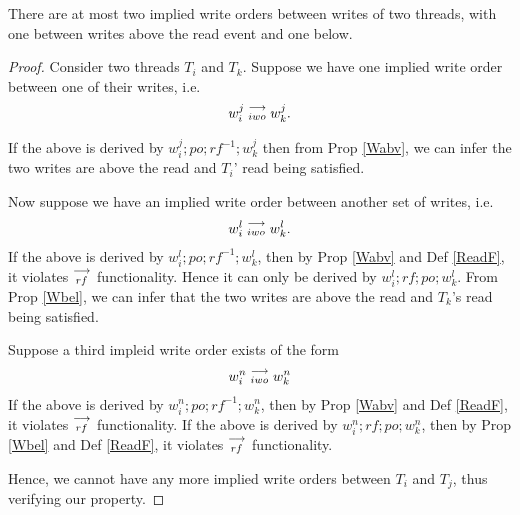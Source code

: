 
    \begin{property}
        \label{prop4}
        There are at most two implied write orders between writes of two threads, with one between writes above the read event and one below. 
    \end{property}
        
    \begin{proof}
        Consider two threads $T_i$ and $T_k$. Suppose we have one implied write order between one of their writes, i.e. 
        \begin{align*}
            w_i^j\stackrel{\longrightarrow}{_{iwo}}w_k^j.    
        \end{align*}

        If the above is derived by $w_i^j;po;rf^{-1};w_k^j$ then from Prop \ref{Wabv}, we can infer the two writes are above the read and $T_i$' read being satisfied.  

        Now suppose we have an implied write order between another set of writes, i.e.
        \begin{align*}
            w_i^l\stackrel{\longrightarrow}{_{iwo}}w_k^l.    
        \end{align*}
        If the above is derived by $w_i^l;po;rf^{-1};w_k^l$, then by Prop \ref{Wabv} and Def \ref{ReadF}, it violates $\stackrel{\longrightarrow}{_{rf}}$ functionality. Hence it can only be derived by $w_i^l;rf;po;w_k^l$. From Prop \ref{Wbel}, we can infer that the two writes are above the read and $T_k$'s read being satisfied.  
        
        Suppose a third impleid write order exists of the form 
        \begin{align*}
            w_i^n\stackrel{\longrightarrow}{_{iwo}}w_k^n
        \end{align*}
        If the above is derived by $w_i^n;po;rf^{-1};w_k^n$, then by Prop \ref{Wabv} and Def \ref{ReadF}, it violates $\stackrel{\longrightarrow}{_{rf}}$ functionality. If the above is derived by $w_i^n;rf;po;w_k^n$, then by Prop \ref{Wbel} and Def \ref{ReadF}, it violates $\stackrel{\longrightarrow}{_{rf}}$ functionality.
        
        Hence, we cannot have any more implied write orders between $T_i$ and $T_j$, thus verifying our property. 

    \end{proof}
        
